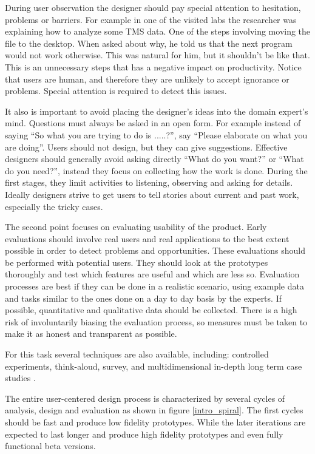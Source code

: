 During user observation the designer should pay special attention to hesitation, problems or barriers. For example in one of the visited labs the researcher was explaining how to analyze some TMS data. One of the steps involving moving the file to the desktop. When asked about why, he told us that the next program would not work otherwise. This was natural for him, but it shouldn't be like that. This is an unnecessary steps that has a negative impact on productivity. Notice that users are human, and therefore they are unlikely to accept ignorance or problems. Special attention is required to detect this issues.

It also is important to avoid placing the designer's ideas into the domain expert's mind. Questions must always be asked in an open form. For example instead of saying ``So what you are trying to do is .....?'', say ``Please elaborate on what you are doing''. Users should not design, but they can give suggestions. Effective designers should generally avoid asking directly ``What do you want?'' or ``What do you need?'', instead they focus on collecting how the work is done. During the first stages, they limit activities to listening, observing and asking for details. Ideally designers strive to get users to tell stories about current and past work, especially the tricky cases. 

\smallskip

The second point focuses on evaluating usability of the product.  Early evaluations should involve real users and real applications to the best extent possible in order to detect problems and opportunities. These evaluations should be performed with potential users. They should look at the prototypes thoroughly and test which features are useful and which are less so. Evaluation processes are best if they can be done in a realistic scenario, using example data and tasks similar to the ones done on a day to day basis by the experts. If possible, quantitative and qualitative data should be collected. There is a high risk of involuntarily biasing the evaluation process, so measures must be taken to make it as honest and transparent as possible. 

For this task several techniques are also available, including: controlled experiments, think-aloud, survey, and multidimensional in-depth long term case studies \autocite{shneiderman_strategies_2006}.

\smallskip

The entire user-centered design process is characterized by several cycles of analysis, design and evaluation as shown in figure \ref{intro_spiral}. The first cycles should be fast and produce low fidelity prototypes. While the later iterations are expected to last longer and produce high fidelity prototypes and even fully functional beta versions. 

